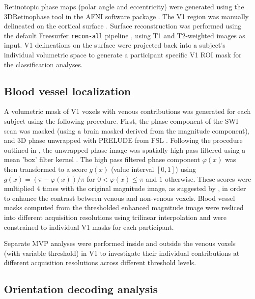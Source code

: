 Retinotopic phase maps (polar angle and eccentricity) were generated using the
3DRetinophase tool in the AFNI software package \citep{cox_1996}. The V1 region
was manually delineated on the cortical surface \citep[following the procedure
described in][]{warnking_2002}. Surface reconstruction was performed using the
default Freesurfer \texttt{recon-all} pipeline \citep{dale_1999}, using T1 and
T2-weighted images as input. V1 delineations on the surface were projected back
into a subject's individual volumetric space to generate a participant specific
V1 ROI mask for the classification analyses.


\subsection*{Blood vessel localization}

\noindent A volumetric mask of V1 voxels with venous contributions was
generated for each subject using the following procedure. First, the phase
component of the SWI scan was masked (using a brain masked derived from the
magnitude component), and 3D phase unwrapped with PRELUDE \citep[default
settings; ][]{jenkinson_2003} from FSL \citep[v5.0.8; ][]{Smith_2004}.
Following the procedure outlined in \citet{haacke_2004}, the unwrapped phase
image was spatially high-pass filtered using a mean 'box' filter kernel
\citep[65x65x65 voxels, as implemented in fslmaths; ][]{Smith_2004}. The high
pass filtered phase component $\varphi(x)$ was then transformed to a score
$g(x)$ (value interval $[0,1]$) using $g(x)=(\pi-\varphi(x))/\pi$ for
$0<\varphi(x)\leq \pi$ and $1$ otherwise.  These scores were multiplied 4 times
with the original magnitude image, as suggested by \citet{haacke_2004}, in
order to enhance the contrast between venous and non-venous voxels. Blood
vessel masks computed from the thresholded enhanced magnitude image were
resliced into different acquisition resolutions using trilinear interpolation
and were constrained to individual V1 masks for each participant.

Separate MVP analyses were performed inside and outside the venous voxels (with
variable threshold) in V1 to investigate their individual contributions at
different acquisition resolutions across different threshold levels.


\subsection*{Orientation decoding analysis}

